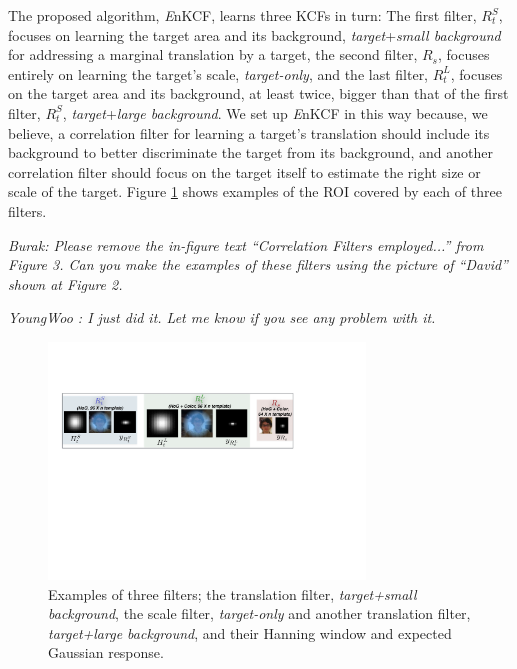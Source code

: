 \documentclass{bmvc2k}
\begin{document}
The proposed algorithm, {\it E}nKCF, learns three KCFs in turn: The
first filter, $R_{t}^{S}$, focuses on learning the target area and its
background, \textit{target}+\textit{small background} for addressing a
marginal translation by a target, the second filter, $R_{s}$, focuses
entirely on learning the target's scale, \textit{target-only}, and the
last filter, $R_{t}^{L}$, focuses on the target area and its
background, at least twice, bigger than that of the first filter,
$R_{t}^{S}$, \textit{target}+\textit{large background}. We set up {\it
  E}nKCF in this way because, we believe, a correlation filter for
learning a target's translation should include its background to
better discriminate the target from its background, and another
correlation filter should focus on the target itself to estimate the
right size or scale of the target. Figure \ref{fig:Filters} shows
examples of the ROI covered by each of three filters. 

{\it Burak: Please remove the in-figure text ``Correlation Filters
  employed...'' from Figure 3. Can you make the examples of these
  filters using the picture of ``David'' shown at Figure 2.}
  
{\it YoungWoo : I just did it. Let me know if you see any problem with it.}

\begin{figure}[!h]
\centering
\includegraphics[width=0.75\textwidth]{figures/Filters_Details.pdf}
\caption{Examples of three filters; the translation filter,
  \textit{target+small background}, the scale filter,
  \textit{target-only} and another translation filter,
  \textit{target+large background}, and their Hanning window and
  expected Gaussian response.}
\label{fig:Filters}
\end{figure}
\end{document}
